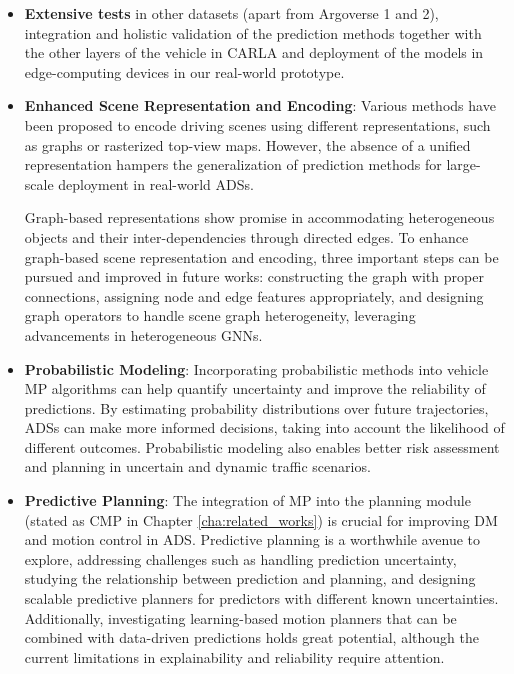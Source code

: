 \begin{itemize}
	
	\item \textbf{Extensive tests} in other datasets (apart from Argoverse 1 and 2), integration and holistic validation of the prediction methods together with the other layers of the vehicle in \ac{CARLA} and deployment of the models in edge-computing devices in our real-world prototype.
	
	\item \textbf{Enhanced Scene Representation and Encoding}: Various methods \cite{zhou2023query} \cite{zhou2022hivt} \cite{cui2023gorela}  have been proposed to encode driving scenes using different representations, such as graphs or rasterized top-view maps. However, the absence of a unified representation hampers the generalization of prediction methods for large-scale deployment in real-world \acp{ADS}. 
	
	Graph-based representations show promise in accommodating heterogeneous objects and their inter-dependencies through directed edges. To enhance graph-based scene representation and encoding, three important steps can be pursued and improved in future works: constructing the graph with proper connections, assigning node and edge features appropriately, and designing graph operators to handle scene graph heterogeneity, leveraging advancements in heterogeneous \acfp{GNN}. 

	\item \textbf{Probabilistic Modeling}: Incorporating probabilistic methods \cite{schmidt2022crat} \cite{wang2022tenet} into vehicle \ac{MP} algorithms can help quantify uncertainty and improve the reliability of predictions. By estimating probability distributions over future trajectories, \acp{ADS} can make more informed decisions, taking into account the likelihood of different outcomes. Probabilistic modeling also enables better risk assessment and planning in uncertain and dynamic traffic scenarios.
	
	\item \textbf{Predictive Planning}: The integration of \ac{MP} into the planning module (stated as \acf{CMP} \cite{tang2019multiple} \cite{rhinehart2019precog} \cite{khandelwal2020if} in Chapter \ref{cha:related_works}) is crucial for improving \ac{DM} and motion control in \ac{ADS}. Predictive planning is a worthwhile avenue to explore, addressing challenges such as handling prediction uncertainty, studying the relationship between prediction and planning, and designing scalable predictive planners for predictors with different known uncertainties. Additionally, investigating learning-based motion planners that can be combined with data-driven predictions holds great potential, although the current limitations in explainability and reliability require attention.
	

\end{itemize}
